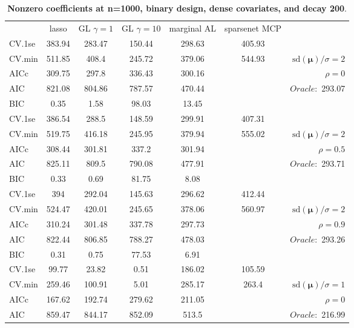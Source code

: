 \clearpage
\begin{table}\vspace{-.5cm}
\caption[l]{ { \bf Nonzero coefficients at n=1000, binary design, 
dense covariates, and  decay  200}.}
\vspace{-.5cm}
\footnotesize{}
\begin{center}
\begin{tabular}{l*{5}{c}|r}
& lasso & GL $\gamma=1$ & GL $\gamma=10$ & marginal AL & sparsenet MCP  & \\
 \cline{1-7}
CV.1se & 383.94 & 283.47 & 150.44 & 298.63 & 405.93 & \\
CV.min & 511.85 & 408.4 & 245.72 & 379.06 & 544.93 &  $\mathrm{sd}(\mathbf{\mu})/\sigma=2$ \\
AICc & 309.75 & 297.8 & 336.43 & 300.16 & & $\rho=0$ \\
AIC & 821.08 & 804.86 & 787.57 & 470.44 & &  \multirow{2}{*}{$Oracle: $ 293.07} \\
BIC & 0.35 & 1.58 & 98.03 & 13.45 & &  \\
 \hline 
CV.1se & 386.54 & 288.5 & 148.59 & 299.91 & 407.31 & \\
CV.min & 519.75 & 416.18 & 245.95 & 379.94 & 555.02 &  $\mathrm{sd}(\mathbf{\mu})/\sigma=2$ \\
AICc & 308.44 & 301.81 & 337.2 & 301.94 & & $\rho=0.5$ \\
AIC & 825.11 & 809.5 & 790.08 & 477.91 & &  \multirow{2}{*}{$Oracle: $ 293.71} \\
BIC & 0.33 & 0.69 & 81.75 & 8.08 & &  \\
 \hline 
CV.1se & 394 & 292.04 & 145.63 & 296.62 & 412.44 & \\
CV.min & 524.47 & 420.01 & 245.65 & 378.06 & 560.97 &  $\mathrm{sd}(\mathbf{\mu})/\sigma=2$ \\
AICc & 310.24 & 301.48 & 337.78 & 297.73 & & $\rho=0.9$ \\
AIC & 822.44 & 806.85 & 788.27 & 478.03 & &  \multirow{2}{*}{$Oracle: $ 293.26} \\
BIC & 0.31 & 0.75 & 77.53 & 6.91 & &  \\
 \hline 
CV.1se & 99.77 & 23.82 & 0.51 & 186.02 & 105.59 & \\
CV.min & 259.46 & 100.91 & 5.01 & 285.17 & 263.4 &  $\mathrm{sd}(\mathbf{\mu})/\sigma=1$ \\
AICc & 167.62 & 192.74 & 279.62 & 211.05 & & $\rho=0$ \\
AIC & 859.47 & 844.17 & 852.09 & 513.5 & &  \multirow{2}{*}{$Oracle: $ 216.99} \\

\end{tabular}
\end{center}
\end{table}
